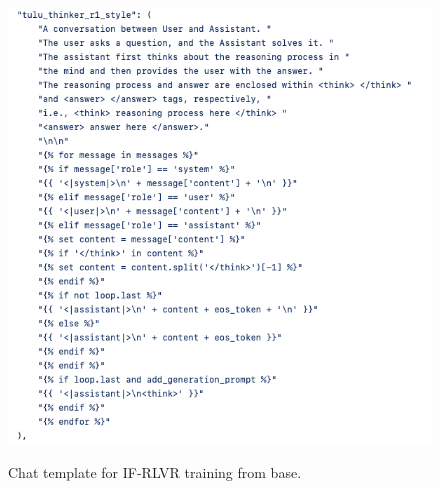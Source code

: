 \documentclass{article}
\begin{document}
\begin{figure}[t]
    \centering
    \includegraphics[width=\linewidth]{figures/chat_template.png}
    \label{fig:chattemplate}
        \caption{Chat template for IF-RLVR training from base.}
\end{figure}
\end{document}
